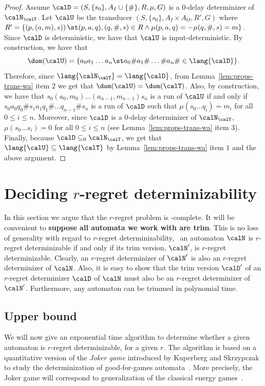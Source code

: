 \documentclass[a4paper]{article}
\begin{document}
\begin{proof}
	Assume $\calD = (S,\{s_0\},A_I \cup\{\#\},R,\mu,G)$ is a $0$-delay
	determinizer of $\calN_\calT$.
	Let $\calU$ be the transducer $(S,\{s_0\},A_I
	\times A_O, R',G)$ where $R' = \{ \left( p,(a,m),s )\right) \st
	(p,a,q), (q,\#,s) \in R \land \mu(p,a,q) = -\mu(q,\#,s) = m \}$.
	Since $\calD$ is deterministic, we have
	that $\calU$ is input-deterministic. By construction, we have that
	\[
		\dom(\calU) = \{ a_0 a_1 \dots a_n \st a_0 \# a_1 \# \dots \#
			a_n \# \in \lang{\calD}\}.
	\]
	Therefore, since $\lang{\calN_\calT} = \lang{\calD}$, from
	Lemma~\ref{lem:props-trans-wa} item $2$ we get that $\dom(\calU) =
	\dom(\calT)$. Also, by construction, we have that
	\(
		s_0(a_0,m_0) \dots (a_{n-1},m_{n-1}) s_n
	\)
	is a run of $\calU$ if and only if $s_0 a_0 q_0 \# s_1 a_1 q_1 \# \dots
	q_{n-1}	\# s_n$ is a run of $\calD$ such that $\mu(s_0 \dots q_i) = m_i$ for all $0 \le i \le n$.
	Moreover, since $\calD$ is a $0$-delay determinizer of $\calN_\calT$, $\mu(s_0 \dots s_i) = 0$ for all $0 \le i \le n$ (see Lemma~\ref{lem:props-trans-wa} item $3$).
	Finally, because $\calD \subseteq_0 \calN_\calT$, we get that
	$\lang{\calU} \subseteq \lang{\calT}$ by
	Lemma~\ref{lem:props-trans-wa} item $1$ and the above argument. 
\end{proof}

\section{Deciding $r$-regret determinizability}
In this section we argue that the $r$-regret problem is \EXP-complete. It will
be convenient to \textbf{suppose all automata we work with are trim}.
This is no loss of generality with regard to
$r$-regret determinizability, \ie~an automaton $\calN$ is $r$-regret
determinizable if and only if its trim version, $\calN'$, is $r$-regret
determinizable. Clearly, an $r$-regret determinizer of $\calN'$ is also an
$r$-regret determinizer of $\calN$. Also, it is easy to show that the trim
version $\calD'$ of an $r$-regret determinizer $\calD$ of $\calN$ must also be
an $r$-regret determinizer of $\calN'$.  Furthermore, any automaton can be
trimmed in polynomial time.
%

\subsection{Upper bound}\label{sec:upper-regret}
We will now give an exponential time algorithm to determine whether a given
automaton is $r$-regret determinizable, for a given $r$. The algorithm is based
on a quantitative version of the \emph{Joker game} introduced by Kuperberg and
Skrzypczak to study the determinization of good-for-games automata~\cite{ks15}.
More precisely, the Joker game will correspond to generalization of the
classical energy games~\cite{cdahs03}.
\end{document}
